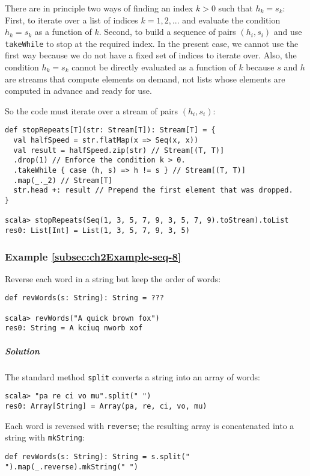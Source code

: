 There are in principle two ways of finding an index $k>0$ such that
$h_{k}=s_{k}$: First, to iterate over a list of indices $k=1,2,...$
and evaluate the condition $h_{k}=s_{k}$ as a function of $k$. Second,
to build a sequence of pairs $\left(h_{i},s_{i}\right)$ and use \lstinline!takeWhile!
to stop at the required index. In the present case, we cannot use
the first way because we do not have a fixed set of indices to iterate
over. Also, the condition $h_{k}=s_{k}$ cannot be directly evaluated
as a function of $k$ because $s$ and $h$ are streams that compute
elements on demand, not lists whose elements are computed in advance
and ready for use. 

So the code must iterate over a stream of pairs $\left(h_{i},s_{i}\right)$:
\begin{lstlisting}
def stopRepeats[T](str: Stream[T]): Stream[T] = {
  val halfSpeed = str.flatMap(x => Seq(x, x))
  val result = halfSpeed.zip(str) // Stream[(T, T)]
  .drop(1) // Enforce the condition k > 0.
  .takeWhile { case (h, s) => h != s } // Stream[(T, T)]
  .map(_._2) // Stream[T]
  str.head +: result // Prepend the first element that was dropped.
}

scala> stopRepeats(Seq(1, 3, 5, 7, 9, 3, 5, 7, 9).toStream).toList
res0: List[Int] = List(1, 3, 5, 7, 9, 3, 5)
\end{lstlisting}


\subsubsection{Example \label{subsec:ch2Example-seq-8}\ref{subsec:ch2Example-seq-8}}

Reverse each word in a string but keep the order of words:
\begin{lstlisting}
def revWords(s: String): String = ???

scala> revWords("A quick brown fox")
res0: String = A kciuq nworb xof
\end{lstlisting}


\subparagraph{Solution}

The standard method \lstinline!split! converts a string into an array
of words:
\begin{lstlisting}
scala> "pa re ci vo mu".split(" ")
res0: Array[String] = Array(pa, re, ci, vo, mu)
\end{lstlisting}
Each word is reversed with \lstinline!reverse!; the resulting array
is concatenated into a string with \lstinline!mkString!:
\begin{lstlisting}
def revWords(s: String): String = s.split(" ").map(_.reverse).mkString(" ")
\end{lstlisting}


